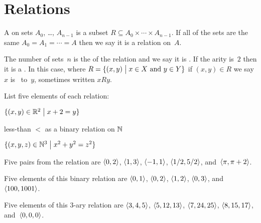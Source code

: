 \documentclass{ibl}  %
\begin{document}
\section{Relations}
\begin{df}
A  on sets $A_0$, \ldots, $A_{n-1}$ is a subset
$R\subseteq A_0\times \cdots \times A_{n-1}$. 
If all of the sets are the same $A_0=A_1=\cdots =A$
then we say it is a relation on~$A$.

The number of sets~$n$ is the  of the relation
and we say it is .
If the arity is~$2$ then it is a .
In this case, where $R=\{(x,y) \bigm| \text{$x\in X$ and $y\in Y$}\}$
if $(x,y)\in R$ we say $x$ is~ to~$y$,
sometimes written $xRy$.
\end{df}

\begin{ex}
List five elements of each relation:
\begin{items}
\item $\{(x,y)\in \mathbb{R}^2 \bigm| x+2=y\}$
\item less-than $<$ as a binary relation on $\mathbb{N}$
\item $\{(x,y,z)\in\mathbb{N}^3 \bigm| x^2+y^2=z^2\}$
\end{items}
\begin{ans}
\begin{items}
\item Five pairs from the relation are
  $\langle0,2\rangle$, $\langle1,3\rangle$, $\langle-1,1\rangle$, $\langle1/2,5/2\rangle$, 
  and~$\langle\pi,\pi+2\rangle$.    
\item Five elements of this binary relation are 
  $\langle0,1\rangle$, $\langle0,2\rangle$, $\langle1,2\rangle$, $\langle0,3\rangle$,
  and~$\langle100,1001\rangle$. 
\item Five elements of this $3$-ary relation are
  $\langle3,4,5\rangle$, $\langle5,12,13\rangle$, $\langle7,24,25\rangle$, 
  $\langle8,15,17\rangle$, and~$\langle0,0,0\rangle$.
\end{items}
\end{ans}
\end{ex}
\end{document}
